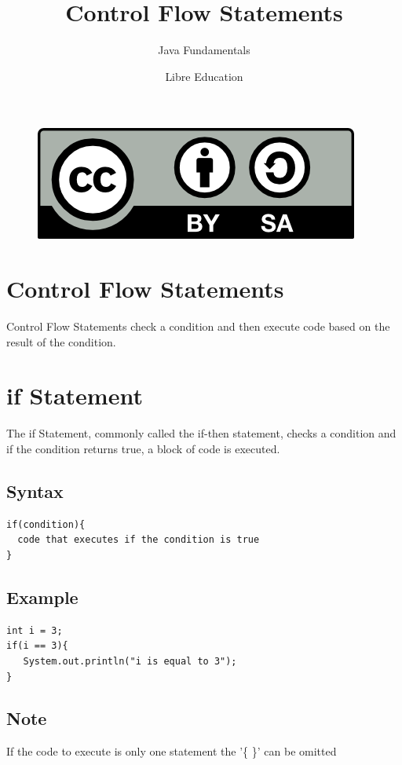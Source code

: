 \documentclass[a4paper]{article}
\title{Control Flow Statements}
\subtitle{Java Fundamentals}
\date{}
\author{Libre Education}
\begin{document}
\maketitle


\begin{figure}[b]
\includegraphics{BY-SA}
\centering
\end{figure}

\newpage

\section*{Control Flow Statements}

Control Flow Statements check a condition and then execute code based on the
result of the condition.

\section*{if Statement}
The if Statement, commonly called the if-then statement, checks a condition and
if the condition returns true, a block of code is executed.

\subsection*{Syntax}

\begin{lstlisting}
if(condition){
  code that executes if the condition is true
}
\end{lstlisting}

\subsection*{Example}

\begin{lstlisting}
int i = 3;
if(i == 3){
   System.out.println("i is equal to 3");
}
\end{lstlisting}

\subsection*{Note}
If the code to execute is only one statement the '\{ \}' can be omitted
\end{document}
